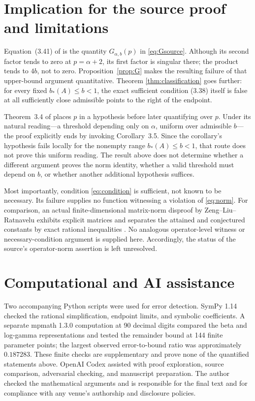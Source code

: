 \documentclass[11pt]{article}
\theoremstyle{remark}
\begin{document}
\section{Implication for the source proof and limitations}

Equation~(3.41) of \cite{li2026norm} is the quantity
$G_{\alpha,b}(p)$ in \eqref{eq:Gsource}.  Although its second factor tends
to zero at $p=\alpha+2$, its first factor is singular there; the product
tends to $4b$, not to zero.  Proposition~\ref{prop:G} makes the resulting
failure of that upper-bound argument quantitative.  Theorem
\ref{thm:classification} goes further: for every fixed
$b_*(A)\leq b<1$, the exact sufficient condition (3.38) itself is false at
all sufficiently close admissible points to the right of the endpoint.

Theorem~3.4 of \cite{li2026norm} places $p$ in a hypothesis before later
quantifying over $p$.  Under its natural reading---a threshold depending
only on $\alpha$, uniform over admissible $b$---the proof explicitly ends
by invoking Corollary~3.5.  Since the corollary's hypothesis fails locally
for the nonempty range $b_*(A)\leq b<1$, that route does not prove this
uniform reading.  The result above does not determine whether a different
argument proves the norm identity, whether a valid threshold must depend on
$b$, or whether another additional hypothesis suffices.

Most importantly, condition \eqref{eq:condition} is sufficient, not known
to be necessary.  Its failure supplies no function witnessing a violation
of \eqref{eq:norm}.  For comparison, an actual finite-dimensional
matrix-norm disproof by Zeng--Liu--Ratnavelu exhibits explicit matrices
and separates the attained and conjectured constants by exact rational
inequalities \cite{zeng2026counterexample}.  No analogous operator-level
witness or necessary-condition argument is supplied here.  Accordingly,
the status of the source's operator-norm assertion is left unresolved.

\section*{Computational and AI assistance}

Two accompanying Python scripts were used for error detection.  SymPy
1.14 \cite{meurer2017sympy} checked the rational simplification, endpoint
limits, and symbolic coefficients.  A separate mpmath 1.3.0 computation at
90 decimal digits compared the beta and log-gamma representations and
tested the remainder bound at 144 finite parameter points; the largest
observed error-to-bound ratio was approximately $0.187283$.  These finite
checks are supplementary and prove none of the quantified statements above.
OpenAI Codex assisted with proof exploration, source comparison, adversarial
checking, and manuscript preparation.  The author checked the mathematical
arguments and is responsible for the final text and for compliance with any
venue's authorship and disclosure policies.



\end{document}
